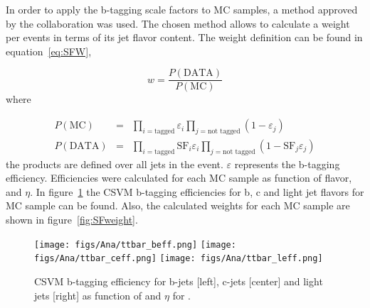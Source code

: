 In order to apply the b-tagging scale factors to MC samples, a method approved by the collaboration was used. The chosen method allows to calculate a weight per events in terms of its jet flavor content. The weight definition can be found in equation~\ref{eq:SFW}, 

\begin{equation}
  \label{eq:SFW}
  w=\frac{P(\text{DATA})}{P(\text{MC})}
\end{equation}where

\begin{eqnarray}
  \label{eq:DataMCSFP}
  P(\text{MC}) & = & \prod_{i=\text{tagged}} \varepsilon_i \prod_{j=\text{not tagged}} (1-\varepsilon_j) \\
  P(\text{DATA}) & = & \prod_{i=\text{tagged}} \text{SF}_i \varepsilon_i \prod_{j=\text{not tagged}} (1-\text{SF}_j \varepsilon_j)
\end{eqnarray}the products are defined over all jets in the event. $\varepsilon$ represents the b-tagging efficiency. Efficiencies were calculated for each MC sample as function of flavor, \pt and $\eta$. In figure~\ref{fig:ttbarBEff} the CSVM b-tagging efficiencies for b, c and light jet flavors for \ttbar MC sample can be found. Also, the calculated weights for each MC sample are shown in figure~\ref{fig:SFweight}. 


\begin{figure}[!Hhtbp]
  \begin{center}
    \texttt{[image: figs/Ana/ttbar\_beff.png]}
    \texttt{[image: figs/Ana/ttbar\_ceff.png]}
    \texttt{[image: figs/Ana/ttbar\_leff.png]}
    \caption{CSVM b-tagging efficiency for b-jets [left], c-jets [center] and light jets [right] as function of \pt and $\eta$ for \ttbar.}
    \label{fig:ttbarBEff}
  \end{center}
\end{figure}

